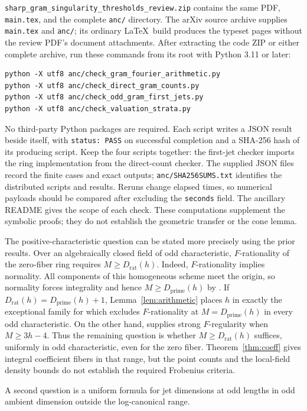 \documentclass[11pt]{article}
\numberwithin{equation}{section}
\theoremstyle{remark}
\newcommand{\Dprime}{D_{\mathrm{prime}}}
\newcommand{\Drat}{D_{\mathrm{rat}}}
\begin{document}
\texttt{sharp\_gram\_singularity\_thresholds\_review.zip} contains
the same PDF, \texttt{main.tex}, and the complete \texttt{anc/} directory.
The arXiv source archive supplies \texttt{main.tex} and \texttt{anc/};
its ordinary \LaTeX\ build produces the typeset pages without the
review PDF's document attachments. After extracting the code ZIP
or either complete archive, run these commands from its root with
Python 3.11 or later:
\begin{verbatim}
python -X utf8 anc/check_gram_fourier_arithmetic.py
python -X utf8 anc/check_direct_gram_counts.py
python -X utf8 anc/check_odd_gram_first_jets.py
python -X utf8 anc/check_valuation_strata.py
\end{verbatim}
No third-party Python packages are required. Each script writes a
JSON result beside itself, with \texttt{status: PASS} on successful
completion and a SHA-256 hash of its producing script. Keep the four
scripts together: the first-jet checker imports the ring implementation
from the direct-count checker. The supplied JSON files record the
finite cases and exact outputs; \texttt{anc/SHA256SUMS.txt} identifies
the distributed scripts and results. Reruns change elapsed times,
so numerical payloads should be compared after excluding the
\texttt{seconds} field. The ancillary README gives the scope of
each check. These computations supplement the symbolic proofs;
they do not establish the geometric transfer or the cone lemma.

The positive-characteristic question can be stated more precisely using
the prior results. Over an algebraically closed field of odd characteristic,
$F$-rationality of the zero-fiber ring requires $M\ge\Drat(h)$.
Indeed, $F$-rationality implies normality. All components of this
homogeneous scheme meet the origin, so normality forces integrality and
hence $M\ge\Dprime(h)$ by \cite[Theorem 2]{CS}. If
$\Drat(h)=\Dprime(h)+1$, Lemma~\ref{lem:arithmetic} places $h$ in exactly
the exceptional family for which \cite[Theorem 1.3]{Xie} excludes
$F$-rationality at $M=\Dprime(h)$ in every odd characteristic.
On the other hand, \cite[Theorem 3.2]{TV} supplies strong $F$-regularity
when $M\ge3h-4$. Thus the remaining question is whether
$M\ge\Drat(h)$ suffices, uniformly in odd characteristic, even for the
zero fiber. Theorem~\ref{thm:coeff} gives integral coefficient fibers in
that range, but the point counts and the local-field density bounds do
not establish the required Frobenius criteria.

A second question is a uniform formula for jet dimensions at odd
lengths in odd ambient dimension outside the log-canonical range.
\end{document}
